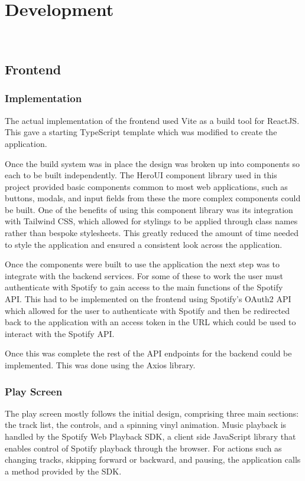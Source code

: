 \chapter{Development}~\label{cha:development}
\section{Frontend}
\subsection{Implementation}
The actual implementation of the frontend used Vite as a build tool for ReactJS. This gave a starting TypeScript template which was modified to create the application.

Once the build system was in place the design was broken up into components so each to be built independently. The HeroUI component library used in this project provided basic components common to most web applications, such as buttons, modals, and input fields from these the more complex components could be built. One of the benefits of using this component library was its integration with Tailwind CSS, which allowed for stylings to be applied through class names rather than bespoke stylesheets. This greatly reduced the amount of time needed to style the application and ensured a consistent look across the application.

Once the components were built to use the application the next step was to integrate with the backend services. For some of these to work the user must authenticate with Spotify to gain access to the main functions of the Spotify API. This had to be implemented on the frontend using Spotify's OAuth2 API which allowed for the user to authenticate with Spotify and then be redirected back to the application with an access token in the URL which could be used to interact with the Spotify API.

Once this was complete the rest of the API endpoints for the backend could be implemented. This was done using the Axios library.

\subsection{Play Screen}


The play screen mostly follows the initial design, comprising three main sections: the track list, the controls, and a spinning vinyl animation. Music playback is handled by the Spotify Web Playback SDK, a client side JavaScript library that enables control of Spotify playback through the browser. For actions such as changing tracks, skipping forward or backward, and pausing, the application calls a method provided by the SDK.

